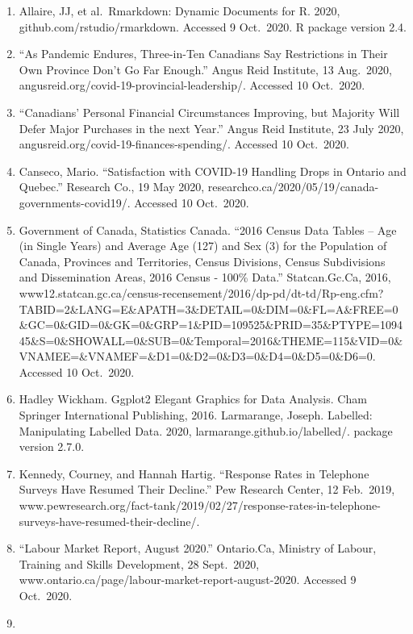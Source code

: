 \documentclass[
]{article}
\begin{document}
\begin{enumerate}
\def\labelenumi{\arabic{enumi}.}
\item
  Allaire, JJ, et al.~Rmarkdown: Dynamic Documents for R. 2020,
  github.com/rstudio/rmarkdown. Accessed 9 Oct.~2020. R package version
  2.4.
\item
  ``As Pandemic Endures, Three-in-Ten Canadians Say Restrictions in
  Their Own Province Don't Go Far Enough.'' Angus Reid Institute, 13
  Aug.~2020, angusreid.org/covid-19-provincial-leadership/. Accessed 10
  Oct.~2020.
\item
  ``Canadians' Personal Financial Circumstances Improving, but Majority
  Will Defer Major Purchases in the next Year.'' Angus Reid Institute,
  23 July 2020, angusreid.org/covid-19-finances-spending/. Accessed 10
  Oct.~2020.
\item
  Canseco, Mario. ``Satisfaction with COVID-19 Handling Drops in Ontario
  and Quebec.'' Research Co., 19 May 2020,
  researchco.ca/2020/05/19/canada-governments-covid19/. Accessed 10
  Oct.~2020.
\item
  Government of Canada, Statistics Canada. ``2016 Census Data Tables --
  Age (in Single Years) and Average Age (127) and Sex (3) for the
  Population of Canada, Provinces and Territories, Census Divisions,
  Census Subdivisions and Dissemination Areas, 2016 Census - 100\%
  Data.'' Statcan.Gc.Ca, 2016,
  www12.statcan.gc.ca/census-recensement/2016/dp-pd/dt-td/Rp-eng.cfm?TABID=2\&LANG=E\&APATH=3\&DETAIL=0\&DIM=0\&FL=A\&FREE=0\&GC=0\&GID=0\&GK=0\&GRP=1\&PID=109525\&PRID=35\&PTYPE=109445\&S=0\&SHOWALL=0\&SUB=0\&Temporal=2016\&THEME=115\&VID=0\&VNAMEE=\&VNAMEF=\&D1=0\&D2=0\&D3=0\&D4=0\&D5=0\&D6=0.
  Accessed 10 Oct.~2020.
\item
  Hadley Wickham. Ggplot2 Elegant Graphics for Data Analysis. Cham
  Springer International Publishing, 2016. Larmarange, Joseph. Labelled:
  Manipulating Labelled Data. 2020, larmarange.github.io/labelled/.
  package version 2.7.0.
\item
  Kennedy, Courney, and Hannah Hartig. ``Response Rates in Telephone
  Surveys Have Resumed Their Decline.'' Pew Research Center, 12
  Feb.~2019,
  www.pewresearch.org/fact-tank/2019/02/27/response-rates-in-telephone-surveys-have-resumed-their-decline/.
\item
  ``Labour Market Report, August 2020.'' Ontario.Ca, Ministry of Labour,
  Training and Skills Development, 28 Sept.~2020,
  www.ontario.ca/page/labour-market-report-august-2020. Accessed 9
  Oct.~2020.
\item

\end{enumerate}
\end{document}
